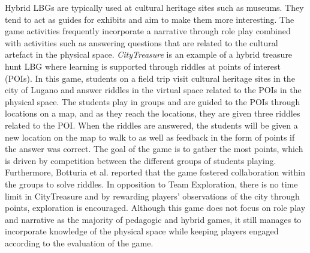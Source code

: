 Hybrid LBGs are typically used at cultural heritage sites such as museums\cite{LBG_Review}. They tend to act as guides for exhibits and aim to make them more interesting. The game activities frequently incorporate a narrative through role play combined with activities such as answering questions that are related to the cultural artefact in the physical space. \textit{CityTreasure} is an example of a hybrid treasure hunt LBG where learning is supported through riddles at points of interest (POIs)\cite{botturi2009city}. In this game, students on a field trip visit cultural heritage sites in the city of Lugano and answer riddles in the virtual space related to the POIs in the physical space. The students play in groups and are guided to the POIs through locations on a map, and as they reach the locations, they are given three riddles related to the POI. When the riddles are answered, the students will be given a new location on the map to walk to as well as feedback in the form of points if the answer was correct. The goal of the game is to gather the most points, which is driven by competition between the different groups of students playing. Furthermore, Botturia et al. reported that the game fostered collaboration within the groups to solve riddles\cite{botturi2009city}. In opposition to Team Exploration, there is no time limit in CityTreasure and by rewarding players' observations of the city through points, exploration is encouraged. Although this game does not focus on role play and narrative as the majority of pedagogic and hybrid games, it still manages to incorporate knowledge of the physical space while keeping players engaged according to the evaluation of the game\cite{botturi2009city}.



